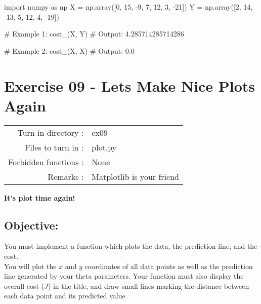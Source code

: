 \documentclass[]{article}
\newenvironment{Shaded}{\begin{snugshade}}{\end{snugshade}}
\newcommand{\CommentTok}[1]{\textcolor[rgb]{0.48,0.49,0.49}{#1}}
\newcommand{\DecValTok}[1]{\textcolor[rgb]{0.96,0.45,0.00}{#1}}
\newcommand{\FloatTok}[1]{\textcolor[rgb]{0.96,0.45,0.00}{#1}}
\newcommand{\ImportTok}[1]{\textcolor[rgb]{0.15,0.68,0.38}{#1}}
\newcommand{\NormalTok}[1]{\textcolor[rgb]{0.81,0.81,0.76}{#1}}
\newcommand{\OperatorTok}[1]{\textcolor[rgb]{0.81,0.81,0.76}{#1}}
\begin{document}
\begin{Shaded}
\begin{Highlighting}[]
\ImportTok{import}\NormalTok{ numpy }\ImportTok{as}\NormalTok{ np}
\NormalTok{X }\OperatorTok{=}\NormalTok{ np.array([}\DecValTok{0}\NormalTok{, }\DecValTok{15}\NormalTok{, }\DecValTok{-9}\NormalTok{, }\DecValTok{7}\NormalTok{, }\DecValTok{12}\NormalTok{, }\DecValTok{3}\NormalTok{, }\DecValTok{-21}\NormalTok{])}
\NormalTok{Y }\OperatorTok{=}\NormalTok{ np.array([}\DecValTok{2}\NormalTok{, }\DecValTok{14}\NormalTok{, }\DecValTok{-13}\NormalTok{, }\DecValTok{5}\NormalTok{, }\DecValTok{12}\NormalTok{, }\DecValTok{4}\NormalTok{, }\DecValTok{-19}\NormalTok{])}

\CommentTok{# Example 1:}
\NormalTok{cost_(X, Y)}
\CommentTok{# Output:}
\FloatTok{4.285714285714286}

\CommentTok{# Example 2:}
\NormalTok{cost_(X, X)}
\CommentTok{# Output:}
\FloatTok{0.0}
\end{Highlighting}
\end{Shaded}

\clearpage

\hypertarget{exercise-09---lets-make-nice-plots-again-1}{%
\section{Exercise 09 - Lets Make Nice Plots
Again}\label{exercise-09---lets-make-nice-plots-again-1}}

\begin{longtable}[]{@{}rl@{}}
\toprule
\endhead
Turn-in directory : & ex09\tabularnewline
Files to turn in : & plot.py\tabularnewline
Forbidden functions : & None\tabularnewline
Remarks : & Matplotlib is your friend\tabularnewline
\bottomrule
\end{longtable}

\textbf{It's plot time again!}

\hypertarget{objective-6}{%
\subsection{Objective:}\label{objective-6}}

You must implement a function which plots the data, the prediction line,
and the cost.\\
You will plot the \(x\) and \(y\) coordinates of all data points as well
as the prediction line generated by your theta parameters. Your function
must also display the overall cost (\(J\)) in the title, and draw small
lines marking the distance between each data point and its predicted
value.
\end{document}
